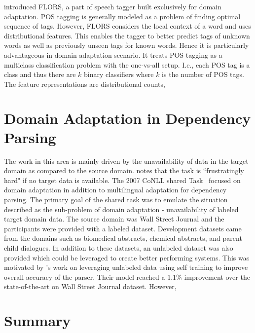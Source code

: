 
\cite{schnabel2014flors} introduced FLORS, a part of speech tagger built exclusively for domain adaptation. POS tagging is generally modeled as a problem of finding optimal sequence of tags. However, FLORS considers the local context of a word and uses distributional features. This enables the tagger to better predict tags of unknown words as well as previously unseen tags for known words. Hence it is particularly advantageous in domain adaptation scenario. It treats POS tagging as a multiclass classification problem with the one-vs-all setup. I.e., each POS tag is a class and thus there are $k$ binary classifiers where $k$ is the number of POS tags. The feature representations are distributional counts, 

\section{Domain Adaptation in Dependency Parsing}

The work in this area is mainly driven by the unavailability of data in the target domain as compared to the source domain. \cite{dredze:blitzer:ea:07} notes that the task is ``frustratingly hard" if no target data is available. The 2007 CoNLL shared Task~\citep{nivre2007conll} focused on domain adaptation in addition to multilingual adaptation for dependency parsing. The primary goal of the shared task was to emulate the situation described as the sub-problem of domain adaptation - unavailability of labeled target domain data. The source domain was Wall Street Journal and the participants were provided with a labeled dataset. Development datasets came from the domains such as biomedical abstracts, chemical abstracts, and parent child dialogues. In addition to these datasets, an unlabeled dataset was also provided which could be leveraged to create better performing systems. This was motivated by \cite{McClosky:2006:RSP:1220175.1220218,McClosky:2006:ESP:1220835.1220855}'s work on leveraging unlabeled data using self training to improve overall accuracy of the parser. Their model reached a 1.1\% improvement over the state-of-the-art on Wall Street Journal dataset. However, \citep{McClosky:2006:RSP:1220175.1220218,McClosky:2006:ESP:1220835.1220855}



\section{Summary}

